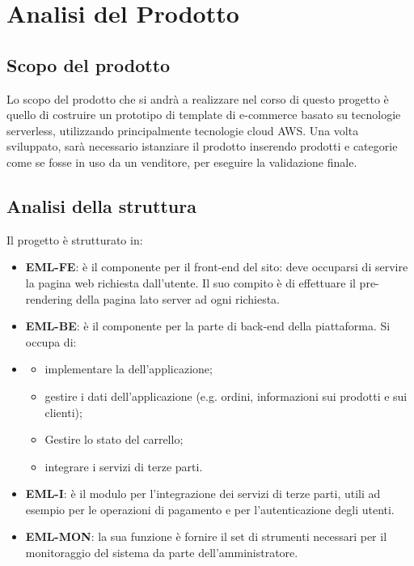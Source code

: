 \section{Analisi del Prodotto}
\subsection{Scopo del prodotto}
Lo scopo del prodotto che si andrà a realizzare nel corso di questo progetto è quello di costruire un prototipo di
template di e-commerce basato su tecnologie serverless, utilizzando principalmente tecnologie cloud AWS.
Una volta sviluppato, sarà necessario istanziare il prodotto inserendo prodotti e categorie come se fosse in uso
da un venditore, per eseguire la validazione finale.

\subsection{Analisi della struttura}
Il progetto  è strutturato in:
\begin{itemize}
    \item \textbf{EML-FE}: è il componente per il front-end del sito: deve occuparsi di servire la pagina web richiesta dall'utente. Il suo compito è di effettuare il pre-rendering della pagina lato server ad ogni richiesta.
	\item \textbf{EML-BE}: è il componente per la parte di back-end della piattaforma. Si occupa di:
	\item \begin{itemize}
        \item implementare la  dell'applicazione;
        \item gestire i dati dell'applicazione (e.g. ordini, informazioni sui prodotti e sui clienti);
        \item Gestire lo stato del carrello;
        \item integrare i servizi di terze parti.
    \end{itemize}
	\item \textbf{EML-I}: è il modulo per l'integrazione dei servizi di terze parti, utili ad esempio per le operazioni di pagamento e per l'autenticazione degli utenti.
	\item \textbf{EML-MON}: la sua funzione è fornire il set di strumenti necessari per il monitoraggio del sistema da parte dell'amministratore.
\end{itemize}

